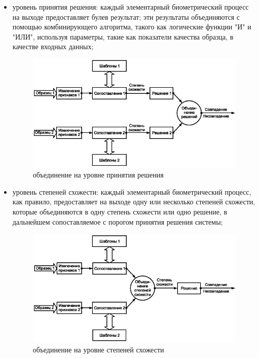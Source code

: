 \documentclass[12pt,a4paper]{article}					%
\begin{document}
\begin{itemize}
\item уровень принятия решения: каждый элементарный биометрический процесс на выходе предоставляет булев результат; эти результаты объединяются с помощью комбинирующего алгоритма, такого как логические функции "И" и "ИЛИ", используя параметры, такие как показатели качества образца, в качестве входных данных;

\begin{figure}[h!]
\centering
\includegraphics[scale=0.60]{res/bio_a}
\caption{объединение на уровне принятия решения}
\end{figure}

\item уровень степеней схожести: каждый элементарный биометрический процесс, как правило, предоставляет на выходе одну или несколько степеней схожести, которые объединяются в одну степень схожести или одно решение, в дальнейшем сопоставляемое с порогом принятия решения системы;

\begin{figure}[h!]
\centering
\includegraphics[scale=0.60]{res/bio_b}
\caption{объединение на уровне степеней схожести}
\end{figure}


\end{itemize}
\end{document}
